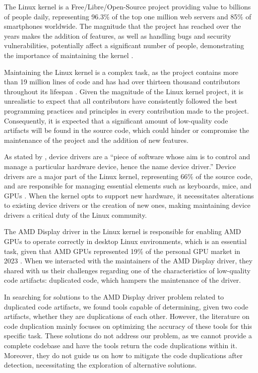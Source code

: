 \en

The Linux kernel is a Free/Libre/Open-Source project providing value to
billions of people daily, representing 96.3\% of the top one million web
servers and 85\% of smartphones worldwide. The magnitude that the project has
reached over the years makes the addition of features, as well as handling bugs
and security vulnerabilities, potentially affect a significant number of
people, demonstrating the importance of maintaining the kernel
\citep{linuxdata}.

Maintaining the Linux kernel is a complex task, as the project contains more
than 19 million lines of code and has had over thirteen thousand contributors
throughout its lifespan \citep{linuxquantity}. Given the magnitude of the Linux
kernel project, it is unrealistic to expect that all contributors have
consistently followed the best programming practices and principles in every
contribution made to the project. Consequently, it is expected that a
significant amount of low-quality code artifacts will be found in the source
code, which could hinder or compromise the maintenance of the project and the
addition of new features.

As stated by \citet{driverdef}, device drivers are a ``piece of software whose
aim is to control and manage a particular hardware device, hence the name
device driver.'' Device drivers are a major part of the Linux kernel,
representing 66\% of the source code, and are responsible for managing
essential elements such as keyboards, mice, and GPUs \citep{marcelo}. When the
kernel opts to support new hardware, it necessitates alterations to existing
device drivers or the creation of new ones, making maintaining device drivers a
critical duty of the Linux community.

The AMD Display driver in the Linux kernel is responsible for enabling AMD GPUs
to operate correctly in desktop Linux environments, which is an essential task,
given that AMD GPUs represented 19\% of the personal GPU market in 2023
\citep{gpumarket}. When we interacted with the maintainers of the AMD Display
driver, they shared with us their challenges regarding one of the
characteristics of low-quality code artifacts: duplicated code, which hampers
the maintenance of the driver.

In searching for solutions to the AMD Display driver problem related to
duplicated code artifacts, we found tools capable of determining, given two
code artifacts, whether they are duplications of each other. However, the
literature on code duplication mainly focuses on optimizing the accuracy
of these tools for this specific task. These solutions do not address our
problem, as we cannot provide a complete codebase and have the tools return the
code duplications within it. Moreover, they do not guide us on how to mitigate
the code duplications after detection, necessitating the exploration of
alternative solutions.

